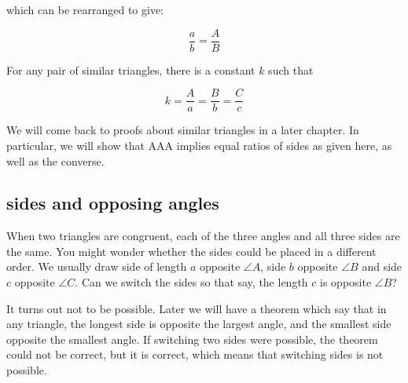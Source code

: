 \documentclass[11pt, oneside]{article}
\begin{document}
which can be rearranged to give:

\[ \frac{a}{b} = \frac{A}{B} \]

For any pair of similar triangles, there is a constant $k$ such that

\[ k = \frac{A}{a} = \frac{B}{b} = \frac{C}{c} \]

We will come back to proofs about similar triangles in a later chapter.  In particular, we will show that AAA implies equal ratios of sides as given here, as well as the converse.

\subsection*{sides and opposing angles}

When two triangles are congruent, each of the three angles and all three sides are the same.  You might wonder whether the sides could be placed in a different order.  We usually draw side of length $a$ opposite $\angle A$, side $b$ opposite $\angle B$ and side $c$ opposite $\angle C$.  Can we switch the sides so that say, the length $c$ is opposite $\angle B$?

It turns out not to be possible.  Later we will have a theorem which say that in any triangle, the longest side is opposite the largest angle, and the smallest side opposite the smallest angle.  If switching two sides were possible, the theorem could not be correct, but it is correct, which means that switching sides is not possible.
\end{document}
